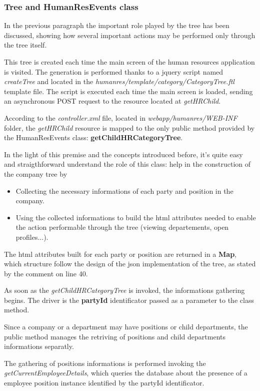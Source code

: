 \subsubsection{Tree and HumanResEvents class}

In the previous paragraph the important role played by the tree has been discussed, showing how several important actions may be performed only through the tree itself.

This tree is created each time the main screen of the human resources application is visited. The generation is performed thanks to a jquery script named \textit{createTree} and located in the \textit{humanres/template/category/CategoryTree.ftl} template file.
The script is executed each time the main screen is loaded, sending an asynchronous POST request to the resource located at \textit{getHRChild}.

According to the \textit{controller.xml} file, located in \textit{webapp/humanres/WEB-INF} folder, the \textit{getHRChild} resource is mapped to the only public method provided by the HumanResEvents class: \textbf{getChildHRCategoryTree}.

In the light of this premise and the concepts introduced before, it's quite easy and straigthforward understand the role of this class: help in the construction of the company tree by

\begin{itemize}
	\item Collecting the necessary informations of each party and position in the company.
	\item Using the collected informations to build the html attributes needed to enable the action performable through the tree (viewing departements, open profiles...).
\end{itemize}

The html attributes built for each party or position are returned in a \textbf{Map}, which structure follow the design of the json implementation of the tree, as stated by the comment on line 40.

As soon as the \textit{getChildHRCategoryTree} is invoked, the informations gathering begins. The driver is the \textbf{partyId} identificator passed as a parameter to the class method.

Since a company or a department may have positions or child departments, the public method manages the retriving of positions and child departments informations separatly.

The gathering of positions informations is performed invoking the \textit{getCurrentEmployeeDetails}, which queries the database about the presence of a employee position instance identified by the partyId identificator.

